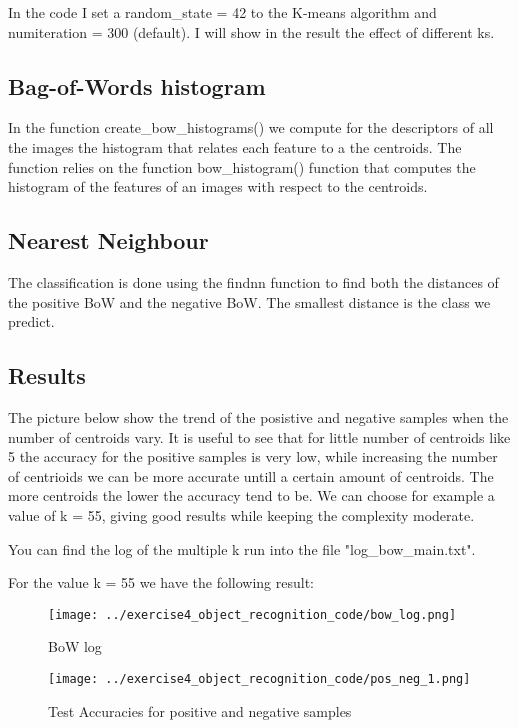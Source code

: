 \documentclass{ETHExercise}
\begin{document}
In the code I set a random\_state = 42 to the K-means algorithm and numiteration = 300 (default). I will show in the result the effect of different ks.

\subsection{Bag-of-Words histogram}
In the function create\_bow\_histograms() we compute for the descriptors of all the images 
the histogram that relates each feature to a the centroids. The function
relies on the function bow\_histogram() function that computes the histogram of the features of an images
with respect to the centroids.

\subsection{Nearest Neighbour}

The classification is done using the findnn function to find both the 
distances of the positive BoW and the negative BoW. The smallest distance
is the class we predict.

\subsection{Results}
The picture below show the trend of the posistive and negative samples when the number
of centroids vary. It is useful to see that for little number of centroids like 5 the accuracy for the positive 
samples is very low, while increasing the number of centrioids we can be more accurate untill a certain amount of centroids. 
The more centroids the lower the accuracy tend to be. We can choose for example a value of k = 55, giving
good results while keeping the complexity moderate.

You can find the log of the multiple k run into the file "log\_bow\_main.txt".

For the value k = 55 we have the following result:

\begin{figure}[!h]
  \centering
  \texttt{[image: ../exercise4\_object\_recognition\_code/bow\_log.png]}
  \caption{BoW log}
\end{figure}


\begin{figure}[!h]
  \centering
  \texttt{[image: ../exercise4\_object\_recognition\_code/pos\_neg\_1.png]}
  \caption{Test Accuracies for positive and negative samples}
\end{figure}
\end{document}
